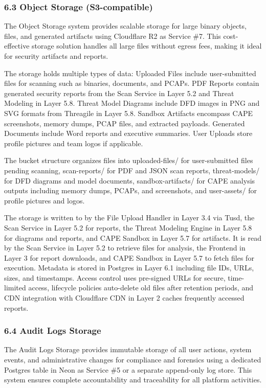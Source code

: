 \documentclass[12pt,a4paper]{report}
\begin{document}
\subsubsection{6.3 Object Storage (S3-compatible)}

The Object Storage system provides scalable storage for large binary objects, files, and generated artifacts using Cloudflare R2 as Service \#7. This cost-effective storage solution handles all large files without egress fees, making it ideal for security artifacts and reports.

The storage holds multiple types of data: Uploaded Files include user-submitted files for scanning such as binaries, documents, and PCAPs. PDF Reports contain generated security reports from the Scan Service in Layer 5.2 and Threat Modeling in Layer 5.8. Threat Model Diagrams include DFD images in PNG and SVG formats from Threagile in Layer 5.8. Sandbox Artifacts encompass CAPE screenshots, memory dumps, PCAP files, and extracted payloads. Generated Documents include Word reports and executive summaries. User Uploads store profile pictures and team logos if applicable.

The bucket structure organizes files into uploaded-files/ for user-submitted files pending scanning, scan-reports/ for PDF and JSON scan reports, threat-models/ for DFD diagrams and model documents, sandbox-artifacts/ for CAPE analysis outputs including memory dumps, PCAPs, and screenshots, and user-assets/ for profile pictures and logos.

The storage is written to by the File Upload Handler in Layer 3.4 via Tusd, the Scan Service in Layer 5.2 for reports, the Threat Modeling Engine in Layer 5.8 for diagrams and reports, and CAPE Sandbox in Layer 5.7 for artifacts. It is read by the Scan Service in Layer 5.2 to retrieve files for analysis, the Frontend in Layer 3 for report downloads, and CAPE Sandbox in Layer 5.7 to fetch files for execution. Metadata is stored in Postgres in Layer 6.1 including file IDs, URLs, sizes, and timestamps. Access control uses pre-signed URLs for secure, time-limited access, lifecycle policies auto-delete old files after retention periods, and CDN integration with Cloudflare CDN in Layer 2 caches frequently accessed reports.

\subsubsection{6.4 Audit Logs Storage}

The Audit Logs Storage provides immutable storage of all user actions, system events, and administrative changes for compliance and forensics using a dedicated Postgres table in Neon as Service \#5 or a separate append-only log store. This system ensures complete accountability and traceability for all platform activities.
\end{document}
